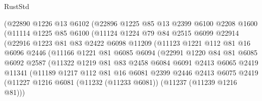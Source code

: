 \begin{lexlean}{RustStd}
\begin{coremodule}
                (@22890
                  @1226
                  @13
                  @6102
                  (@22896
                    @1225
                    @85
                    @13
                    @2399
                    @6100
                    @2208
                    @1600
                    (@11114
                      @1225
                      @85
                      @6100
                      (@11124
                        @1224
                        @79
                        @84
                        @2515
                        @6099
                        @22914
                        (@22916
                          @1223
                          @81
                          @83
                          @2422
                          @6098
                          @11209
                          (@11123
                            @1221
                            @112
                            @81
                            @16
                            @6096
                            @2446
                            (@11166
                              @1221
                              @81
                              @6085
                              @6094
                              (@22991
                                @1220
                                @84
                                @81
                                @6085
                                @6092
                                @2587
                                (@11322
                                  @1219
                                  @81
                                  @83
                                  @2458
                                  @6084
                                  @6091
                                  @2413
                                  @6065
                                  @2419
                                  @11341
                                  (@11189
                                    @1217
                                    @112
                                    @81
                                    @16
                                    @6081
                                    @2399
                                    @2446
                                    @2413
                                    @6075
                                    @2419
                                    (@11227
                                      @1216
                                      @6081
                                      (@11232 (@11233 @6081))
                                      (@11237 (@11239 @1216 @81)))

\end{coremodule}
\end{lexlean}

